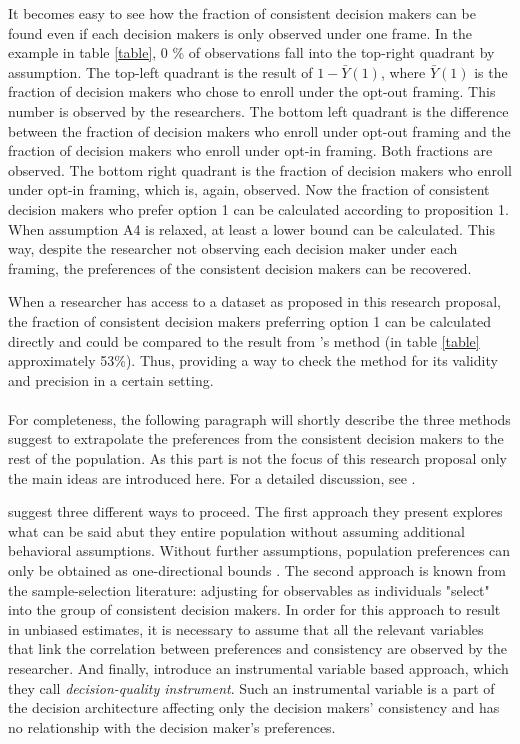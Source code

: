 It becomes easy to see how the fraction of consistent decision makers can be found even if each decision makers is only observed under one frame.
In the example in table \ref{table}, 0 \% of observations fall into the top-right quadrant by assumption.
The top-left quadrant is the result of $1-\bar{Y}(1)$, where $\bar{Y}(1)$
is the fraction of decision makers who chose to enroll under the opt-out framing. This number is observed by the researchers.
The bottom left quadrant is the difference between the fraction of decision makers who enroll under opt-out framing and the fraction
of decision makers who enroll under opt-in framing. Both fractions are observed.
The bottom right quadrant is the fraction of decision makers who enroll under opt-in framing, which is, again, observed.
Now the fraction of consistent decision makers who prefer option 1 can be calculated according to proposition 1. When assumption A4 is relaxed,
at least a lower bound can be calculated.
This way, despite the researcher not observing each decision maker under each framing, the preferences of the consistent decision makers can be recovered.

When a researcher has access to a dataset as proposed in this research proposal, the fraction of consistent decision makers preferring
option 1 can be calculated directly and could be compared to the result from \textcite{goldin2020}'s method (in table \ref{table} approximately 53\%). Thus, providing
a way to check the method for its validity and precision in a certain setting.
\\
\\
For completeness, the following paragraph will shortly describe the three methods \textcite[p.2769]{goldin2020} suggest to extrapolate the preferences from the consistent decision makers
to the rest of the population.  As this part is not the focus of this research proposal only the main ideas are introduced here. For a detailed discussion, see \textcite[p.2767]{goldin2020}.

\textcite{goldin2020} suggest three different ways to proceed.
The first approach they present explores what can be said abut they entire population without assuming additional  behavioral assumptions.
Without further assumptions, population preferences can only be obtained as one-directional bounds \parencite[p. 2772]{goldin2020}. 
The second approach is known from the sample-selection literature: adjusting for observables as individuals "select" into the group of consistent decision makers.
In order for this approach to result in unbiased estimates, it is necessary to assume that all the relevant variables that link the
correlation between preferences and consistency are observed by the researcher. And finally, \textcite{goldin2020} introduce an instrumental variable based approach, 
which they call \textit{decision-quality instrument}. Such an instrumental variable is a part of the decision architecture affecting   
only the decision makers' consistency and has no relationship with the decision maker's preferences.




